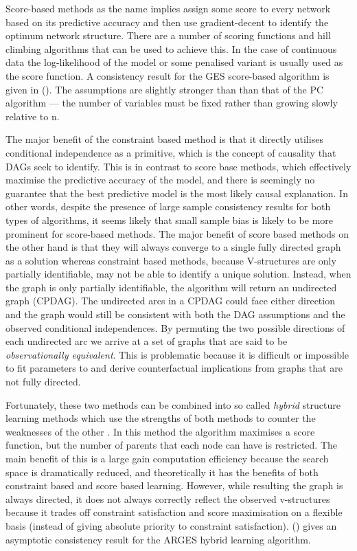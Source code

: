 \documentclass{article}
\begin{document}
Score-based methods as the name implies assign some score to every network based on its predictive accuracy and then use gradient-decent to identify the optimum network structure. There are a number of scoring functions and hill climbing algorithms that can be used to achieve this. In the case of continuous data the log-likelihood of the model or some penalised variant is usually used as the score function. A consistency result for the GES score-based algorithm is given in \citeauthor{chickering2002optimal} (\citeyear{chickering2002optimal}). The assumptions are slightly stronger than than that of the PC algorithm --- the number of variables must be fixed rather than growing slowly relative to n.

The major benefit of the constraint based method is that it directly utilises conditional independence as a primitive, which is the concept of causality that DAGs seek to identify. This is in contrast to score base methods, which effectively maximise the predictive accuracy of the model, and there is seemingly no guarantee that the best predictive model is the most likely causal explanation. In other words, despite the presence of large sample consistency results for both types of algorithms, it seems likely that small sample bias is likely to be more prominent for score-based methods. The major benefit of score based methods on the other hand is that they will always converge to a single fully directed graph as a solution whereas constraint based methods, because V-structures are only partially identifiable, may not be able to identify a unique solution. Instead, when the graph is only partially identifiable, the algorithm will return an undirected graph (CPDAG). The undirected arcs in a CPDAG could face either direction and the graph would still be consistent with both the DAG assumptions and the observed conditional independences. By permuting the two possible directions of each undirected arc we arrive at a set of graphs that are said to be \textit{observationally equivalent}. This is problematic because it is difficult or impossible to fit parameters to and derive counterfactual implications from graphs that are not fully directed.  

Fortunately, these two methods can be combined into so called \textit{hybrid} structure learning methods which use the strengths of both methods to counter the weaknesses of the other \parencite{scutari2014multiple} \parencite{friedman2013learning}. In this method the algorithm maximises a score function, but the number of parents that each node can have is restricted. The main benefit of this is a large gain computation efficiency because the search space is dramatically reduced, and theoretically it has the benefits of both constraint based and score based learning. However, while resulting the graph is always directed, it does not always correctly reflect the observed v-structures because it trades off constraint satisfaction and score maximisation on a flexible basis (instead of giving absolute priority to constraint satisfaction). \citeauthor{nandy2018high} (\citeyear{nandy2018high}) gives an asymptotic consistency result for the ARGES hybrid learning algorithm.
\end{document}
